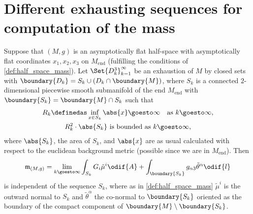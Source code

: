 \documentclass[titlepage,numbers=noenddot,oneside,%
cleardoublepage=empty,paper=a4,fontsize=11pt,%
english,%
]{scrartcl}
\newcommand{\Mend}{M_{\mathrm{end}}} %
\newcommand{\mass}[2]{\mathfrak{m}_{(#1,#2)}} %
\newcommand{\todomark}{%
    \colorbox{purple}{%
        \textnormal\ttfamily\bfseries\color{white}%
        TODO%
    }%
}
\newcommand{\todo}[1][]{%
    \ifstrempty{#1}{%
        \def\todotext{Todo}%
    }{%
        \def\todotext{Todo: #1}%
    }%
    \todomark%
    {%
        \marginpar{%
            \raggedright\normalfont\sffamily\scriptsize\todotext%
        }%
    }%
}
\begin{document}
\newpage
\appendix
\section{Different exhausting sequences for computation of the mass}
\begin{proposition}\label{prop:mass_independent_of_exhausting_sequence}
    Suppose that \( (M,g) \) is an asymptotically flat half-space with asymptotically flat coordinates \( x_1,x_2,x_3 \) on \( \Mend \) (fulfilling the conditions of \cref{def:half_space_mass}). Let \( \Set{D_k^3}_{k=1}^{\infty} \) be an exhaustion of \( M \) by closed sets with \( \boundary{D_k}=S_k\cup (D_k\cap \boundary{M}) \), where \( S_k \) is a connected \( 2 \)-dimensional piecewise smooth submanifold of the end \( \Mend \) with \( \boundary{S_k}=\boundary{M}\cap S_k \) such that
    \begin{gather*}
        R_k\definedas \inf_{x\in S_k} \abs{x}\goesto \infty\quad \text{as \( k\goesto \infty \)},\\
        R_k^2\cdot \abs{S_k} \text{ is bounded as \( k\goesto \infty \)},
    \end{gather*}
    where \( \abs{S_k} \), the area of \( S_k \), and \( \abs{x} \) are as usual calculated with respect to the euclidean background metric (possible since we are in \( \Mend \)). Then
    \begin{equation*}
        \mass{M}{g}=\lim_{k \goesto \infty}\int_{S_k}G_i\tilde{\mu}^i\odif{A}+\int_{\boundary{S_k}}g_{\alpha 3}\tilde{\theta}^\alpha\odif{l}
    \end{equation*}
    is independent of the sequence \( S_k \), where as in \cref{def:half_space_mass} \( \tilde{\mu}^i \) is the outward normal to \( S_k \) and \( \tilde{\theta}^\alpha \) the co-normal to \( \boundary{S_k} \) oriented as the boundary of the compact component of \( \boundary{M}\setminus \boundary{S_k} \).
\end{proposition}
\end{document}

